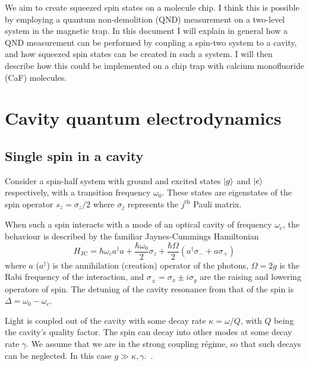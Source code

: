 We aim to create squeezed spin states on a molecule chip. I think this is
possible by employing a quantum non-demolition (QND) measurement on a two-level
system in the magnetic trap. In this document I will explain in general how
a QND measurement can be performed by coupling a spin-two system to a cavity,
and how squeezed spin states can be created in such a system. I will then
describe how this could be implemented on a chip trap with calcium monofluoride
(CaF) molecules.

\section{Cavity quantum electrodynamics}

\subsection{Single spin in a cavity}

Consider a spin-half system with ground and excited states $\ket{g}$
and $\ket{e}$ respectively, with a transition frequency $\omega_0$. These
states are eigenstates of the spin operator $s_z = \sigma_z /2$ where
$\sigma_j$ represents the $j^\text{th}$ Pauli matrix.

When such a spin interacts with a mode of an optical cavity of frequency
$\omega_c$, the behaviour is described by the familiar Jaynes-Cummings
Hamiltonian~\cite{}
%
\begin{equation}
  H_\text{JC} = \hbar\omega_c a^\dagger a + \frac{\hbar \omega_0}{2}\sigma_z +
  \frac{\hbar\Omega}{2}(a^\dagger \sigma_- + a\sigma_+)
  \label{JCH}
\end{equation}
%
where $a$ ($a^\dagger$) is the annihilation (creation) operator of the photons,
$\Omega = 2g$ is the Rabi frequency of the interaction, and $\sigma_\pm =
\sigma_x \pm i\sigma_y$ are the raising and lowering operators of spin. The
detuning of the cavity resonance from that of the spin is $\Delta = \omega_0 -
\omega_c$.

Light is coupled out of the cavity with some decay rate $\kappa = \omega/Q$,
with $Q$ being the cavity's quality factor. The spin can decay into other modes
at some decay rate $\gamma$. We assume that we are in the strong coupling
r\'egime, so that such decays can be neglected. In this case $g \gg \kappa,
\gamma$.~\cite{PhysRevA.69.062320}.

